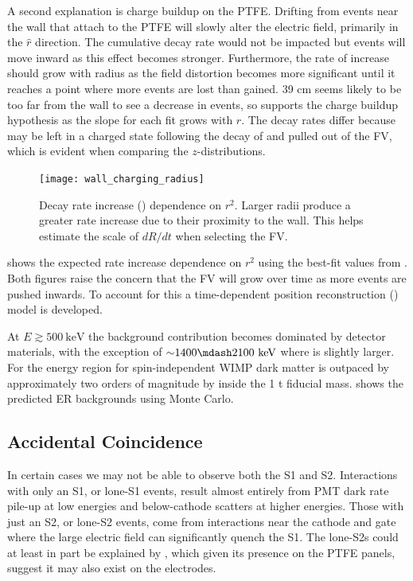 A second explanation is charge buildup on the PTFE.  Drifting \electron from events near the wall that attach to the PTFE will slowly
alter the electric field, primarily in the $\hat{r}$ direction.  The cumulative decay rate would not be impacted but events will move
inward as this effect becomes stronger.  Furthermore, the rate of increase should grow with radius as the field distortion
becomes more significant until it reaches a point where more events are lost than gained.  39 cm seems likely to be too far from the wall
to see a decrease in events, so
 supports the charge buildup hypothesis as the slope for each fit grows with $r$.  The
decay rates differ because  may be left in a charged state following the decay of  and pulled out of the
FV, which is evident when comparing the $z$-distributions.

\begin{figure}
\centering
\texttt{[image: wall\_charging\_radius]}
\caption{Decay rate increase () dependence on $r^2$.  Larger radii produce a greater rate increase due
to their proximity to the wall.  This helps estimate the scale of $dR/dt$ when selecting the FV.}
\label{fig:backgrounds_detector_materials_wall_charge_radius}
\end{figure}

 shows the expected rate increase dependence on $r^2$ using the best-fit
values from .  Both figures
raise the concern that the FV will grow over time as more events are pushed inwards.  To account for this a time-dependent position
reconstruction () model is developed.

At $E \gtrsim 500\ \mathrm{keV}$ the background contribution becomes dominated by detector materials, with the exception of
${\sim} 1400 \mdash 2100\ \mathrm{keV}$ where  is slightly larger.  For the energy region for spin-independent WIMP dark
matter  is outpaced by approximately two orders of magnitude by  inside the 1 t
fiducial mass.   shows the predicted ER backgrounds using Monte Carlo.



\subsection{Accidental Coincidence}
\label{subsec:backgrounds_ac}
In certain cases we may not be able to observe both the S1 and S2.  Interactions with only an S1, or lone-S1 events, result almost
entirely from PMT dark rate pile-up at low energies and below-cathode scatters at higher energies.  Those with just an S2, or lone-S2
events, come from interactions near the cathode and gate where the large electric field can significantly quench the S1.  The lone-S2s
could at least in part be explained by , which given its presence on the PTFE panels, suggest it may also exist on the
electrodes.

